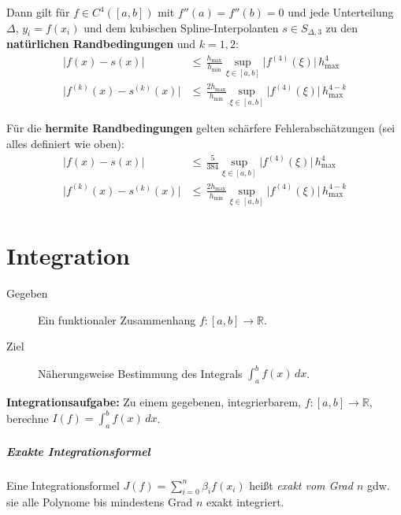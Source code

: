 \documentclass[a4paper, 11pt, accentcolor = tud3b]{tudreport}
\newcommand{\abs}[1]{\ensuremath{{\lvert #1 \rvert}}}
\newcommand{\R}{\ensuremath{\mathbb{R}}}
\begin{document}
					Dann gilt für \( f \in C^4([a, b]) \) mit \( f''(a) = f''(b) = 0 \) und jede Unterteilung \( \Delta \), \( y_i = f(x_i) \) und dem kubischen Spline-Interpolanten \( s \in S_{\Delta, 3} \) zu den \textbf{natürlichen Randbedingungen} und \( k = 1, 2 \):
					\begin{align*}
						\abs{f(x) - s(x)}             & \leq\, \frac{h_\textrm{max}}{h_\textrm{min}} \sup_{\xi \in [a, b]} \abs{f^{(4)}(\xi)} \, h_\textrm{max}^4         \\
						\abs{f^{(k)}(x) - s^{(k)}(x)} & \leq\, \frac{2 h_\textrm{max}}{h_\textrm{min}} \sup_{\xi \in [a, b]} \abs{f^{(4)}(\xi)} \, h_\textrm{max}^{4 - k}
					\end{align*}
					
					Für die \textbf{hermite Randbedingungen} gelten schärfere Fehlerabschätzungen (sei alles definiert wie oben):
					\begin{align*}
						\abs{f(x) - s(x)} &\leq\, \frac{5}{384} \sup_{\xi \in [a, b]} \abs{f^{(4)}(\xi)} \, h_\textrm{max}^4 \\
						\abs{f^{(k)}(x) - s^{(k)}(x)} &\leq\, \frac{2 h_\textrm{max}}{h_\textrm{min}} \sup_{\xi \in [a, b]} \abs{f^{(4)}(\xi)} \, h_\textrm{max}^{4 - k}
					\end{align*}
	
	\chapter{Integration}
		\label{c:integration}
		
		\begin{description}
			\item[Gegeben] Ein funktionaler Zusammenhang \( f : [a, b] \rightarrow \R \).
			\item[Ziel] Näherungsweise Bestimmung des Integrals \( \int_{a}^{b} \! f(x) \, dx \).
		\end{description}
		\textbf{Integrationsaufgabe:} Zu einem gegebenen, integrierbarem, \( f : [a, b] \rightarrow \R \), berechne \( I(f) = \int_{a}^{b} \! f(x) \, dx \).
		
		\paragraph{Exakte Integrationsformel}
			Eine Integrationsformel \( J(f) = \sum_{i = 0}^{n} \beta_i f(x_i) \) heißt \textit{exakt vom Grad \(n\)} gdw. sie alle Polynome bis mindestens Grad \(n\) exakt integriert.
	
\end{document}
